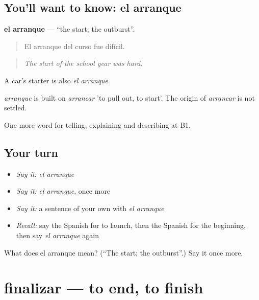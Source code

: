 \subsection*{You'll want to know: el arranque}
\textbf{el arranque} — \textquotedblleft{}the start; the outburst\textquotedblright{}.

\begin{quote}
El arranque del curso fue difícil.
\end{quote}

\begin{quote}
\emph{The start of the school year was hard.}
\end{quote}

A car's starter is also \emph{el arranque}.

\begin{cousinweb}
\emph{arranque} is built on \emph{arrancar} 'to pull out, to start'. The origin of \emph{arrancar} is not settled.
\end{cousinweb}

\begin{grammarlens}[title={What you've built}]
One more word for telling, explaining and describing at B1.
\end{grammarlens}

\subsection*{Your turn}
\begin{itemize}
\raggedright
  \item \emph{Say it:} \emph{el arranque}
  \item \emph{Say it:} \emph{el arranque}, once more
  \item \emph{Say it:} a sentence of your own with \emph{el arranque}
  \item \emph{Recall:} say the Spanish for to launch, then the Spanish for the beginning, then say \emph{el arranque} again
\end{itemize}

\begin{tcolorbox}[breakable,colback=teal!4,colframe=teal!35!black,title={Before you move on}]
What does el arranque mean? (\textquotedblleft{}The start; the outburst\textquotedblright{}.) Say it once more.
\end{tcolorbox}
\section[finalizar]{finalizar — to end, to finish}

